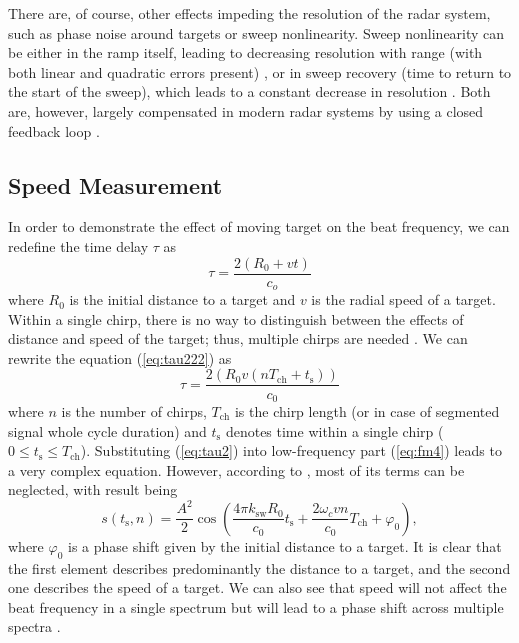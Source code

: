 There are, of course, other effects impeding the resolution of the radar system, such as phase noise around targets or sweep nonlinearity.
Sweep nonlinearity can be either in the ramp itself, leading to decreasing resolution with range (with both linear and quadratic errors present)  \cite{graham2005}, or in sweep recovery (time to return to the start of the sweep), which leads to a constant decrease in resolution \cite{piper1995}.
Both are, however, largely compensated in modern radar systems by using a closed feedback loop  \cite{graham2005}.


\subsection{Speed Measurement}

In order to demonstrate the effect of moving target on the beat frequency, we can redefine the time delay $\tau$ as
\begin{equation}
  \tau = \frac{2(R_0+vt)}{c_o}
  \label{eq:tau222}
\end{equation}
where $R_0$ is the initial distance to a target and $v$ is the radial speed of a target.
Within a single chirp, there is no way to distinguish between the effects of distance and speed of the target; thus, multiple chirps are needed \cite{suleymanov2016}.
We can rewrite the equation (\ref{eq:tau222}) as
\begin{equation}
  \tau = \frac{2(R_0 v(nT_\mathrm{ch} + t_\mathrm{s}))}{c_0}
  \label{eq:tau2}
\end{equation}
where $n$ is the number of chirps, $T_\mathrm{ch}$ is the chirp length (or in case of segmented signal whole cycle duration) and $t_\mathrm{s}$ denotes time within a single chirp ($0 \leq t_\mathrm{s} \leq T_\mathrm{ch}$).
Substituting (\ref{eq:tau2}) into low-frequency part (\ref{eq:fm4}) leads to a very complex equation.
However, according to \cite{suleymanov2016}, most of its terms can be neglected, with result being
\begin{equation}
  s(t_\mathrm{s}, n) = \frac{A^2}{2} \cos\left(\frac{4\pi k_\mathrm{sw} R_0}{c_0} t_\mathrm{s} + \frac{2\omega_c v n}{c_0} T_\mathrm{ch} + \varphi_0 \right),
  \label{eq:fb2}
\end{equation}
where $\varphi_0$ is a phase shift given by the initial distance to a target.
It is clear that the first element describes predominantly the distance to a target, and the second one describes the speed of a target.
We can also see that speed will not affect the beat frequency in a single spectrum but will lead to a phase shift across multiple spectra \cite{suleymanov2016}.

